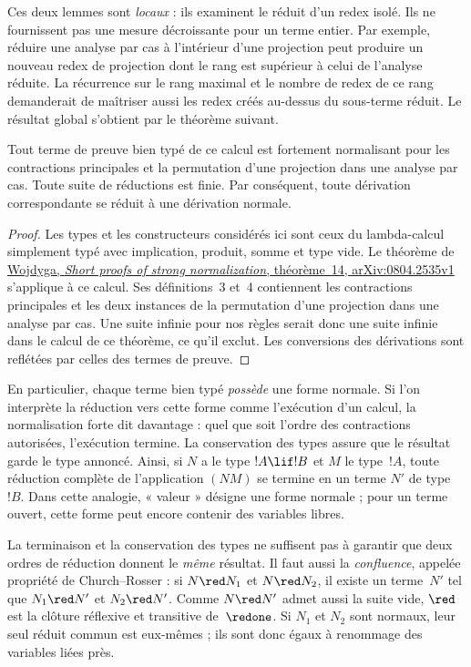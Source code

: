 \documentclass[../../../include/open-logic-section]{subfiles}
\begin{document}
Ces deux lemmes sont \emph{locaux} : ils examinent le
réduit d'un redex isolé. Ils ne fournissent pas une
mesure décroissante pour un terme entier. Par exemple,
réduire une analyse par cas à l'intérieur d'une projection
peut produire un nouveau redex de projection dont le
rang est supérieur à celui de l'analyse réduite.
La récurrence sur le rang maximal et le nombre de redex
de ce rang demanderait de maîtriser aussi les redex
créés au-dessus du sous-terme réduit. Le résultat global
s'obtient par le théorème suivant.

\begin{thm}
  Tout terme de preuve bien typé de ce calcul est
  fortement normalisant pour les contractions principales
  et la permutation d'une projection dans une analyse
  par cas. Toute suite de réductions est finie.
  Par conséquent, toute dérivation correspondante
  se réduit à une dérivation normale.
\end{thm}
\begin{proof}
  Les types et les constructeurs considérés ici sont
  ceux du lambda-calcul simplement typé avec implication,
  produit, somme et type vide. Le théorème de
  \href{https://arxiv.org/abs/0804.2535}{Wojdyga,
  \emph{Short proofs of strong normalization},
  théorème~14, arXiv:0804.2535v1} s'applique à ce calcul.
  Ses définitions~3 et~4 contiennent les contractions
  principales et les deux instances de la permutation
  d'une projection dans une analyse par cas. Une suite
  infinie pour nos règles serait donc une suite infinie
  dans le calcul de ce théorème, ce qu'il exclut.
  Les conversions des dérivations sont reflétées par
%
%
  celles des termes de preuve.
\end{proof}

En particulier, chaque terme bien typé
\emph{possède} une forme normale. Si l'on interprète
la réduction vers cette forme comme l'exécution d'un
calcul, la normalisation forte dit davantage :
quel que soit l'ordre des contractions autorisées,
l'exécution termine. La conservation des types assure
que le résultat garde le type annoncé. Ainsi, si
$N$ a le type $!A \lif !B$ et $M$ le type~$!A$,
toute réduction complète de l'application $(NM)$
se termine en un terme $N'$ de type~$!B$.
Dans cette analogie, « valeur » désigne une forme
normale ; pour un terme ouvert, cette forme peut
encore contenir des variables libres.

La terminaison et la conservation des types ne suffisent
pas à garantir que deux ordres de réduction donnent
le \emph{même} résultat. Il faut aussi la
\emph{confluence}, appelée propriété de
Church--Rosser : si $N \red N_1$ et $N \red N_2$,
il existe un terme~$N'$ tel que $N_1 \red N'$
et $N_2 \red N'$. Comme $N \red N'$ admet aussi
la suite vide, $\red$ est la clôture réflexive et
transitive de~$\redone$. Si $N_1$ et $N_2$ sont
normaux, leur seul réduit commun est eux-mêmes ;
ils sont donc égaux à renommage des variables liées
près.
\end{document}
